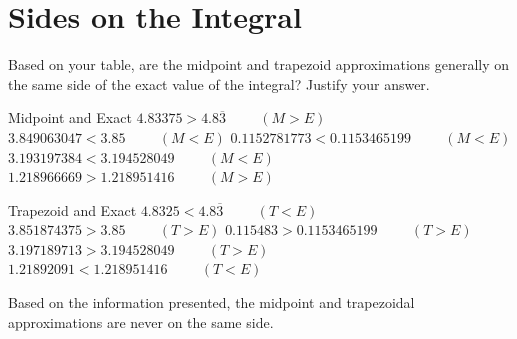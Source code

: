 \documentclass[letterpaper,12pt]{article}
\theoremstyle{definition}
\begin{document}
\pagebreak

\section{Sides on the Integral}

\raggedright

\begin{large}

 Based on your table, are the midpoint and trapezoid approximations generally on the same side of the exact value of the integral? Justify your answer.

\end{large}

\vspace{1cm}

\begin{minipage}{0.45\textwidth}
 \begin{center}
  Midpoint and Exact
  \vskip 16pt
  \mbox{$4.83375>4.8\overline{3}\hspace{1cm}(M>E)$}
  \vskip 16pt
  \mbox{$3.849063047<3.85\hspace{1cm}(M<E)$}
  \vskip 16pt
  \mbox{$0.1152781773<0.1153465199\hspace{1cm}(M<E)$}
  \vskip 16pt
  \mbox{$3.193197384<3.194528049\hspace{1cm}(M<E)$}
  \vskip 16pt
  \mbox{$1.218966669>1.218951416\hspace{1cm}(M>E)$}
 \end{center}
\end{minipage}
\hfill
\begin{minipage}{0.45\textwidth}
 \begin{center}
  Trapezoid and Exact
  \vskip 16pt
  $4.8325<4.8\overline{3}\hspace{1cm}(T<E)$
  \vskip 16pt
  $3.851874375>3.85\hspace{1cm}(T>E)$
  \vskip 16pt
  $0.115483>0.1153465199\hspace{1cm}(T>E)$
  \vskip 16pt
  $3.197189713>3.194528049\hspace{1cm}(T>E)$
  \vskip 16pt
  $1.21892091<1.218951416\hspace{1cm}(T<E)$
 \end{center}
\end{minipage}

\vspace{1cm}

Based on the information presented, the midpoint and trapezoidal approximations are never on the same side.
\end{document}
